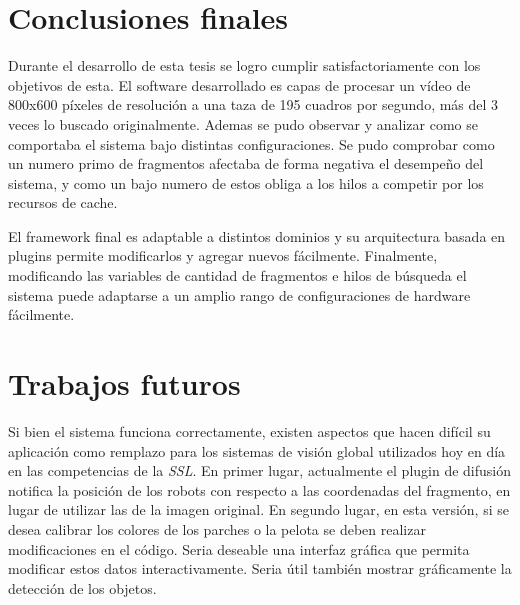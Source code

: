 
\section{Conclusiones finales}

Durante el desarrollo de esta tesis se logro cumplir satisfactoriamente con los
objetivos de esta. El software desarrollado es capas de procesar un vídeo de
800x600 píxeles de resolución a una taza de 195 cuadros por segundo, más del 3
veces lo buscado originalmente. Ademas se pudo observar y analizar como se
comportaba el sistema bajo distintas configuraciones. Se pudo comprobar como un
numero primo de fragmentos afectaba de forma negativa el desempeño del sistema,
y como un bajo numero de estos obliga a los hilos a competir por los recursos de
cache.

El framework final es adaptable a distintos dominios y su arquitectura basada en
plugins permite modificarlos y agregar nuevos fácilmente. Finalmente,
modificando las variables de cantidad de fragmentos e hilos de búsqueda el
sistema puede adaptarse a un amplio rango de configuraciones de hardware
fácilmente.

\section{Trabajos futuros}

Si bien el sistema funciona correctamente, existen aspectos que hacen difícil su
aplicación como remplazo para los sistemas de visión global utilizados hoy en
día en las competencias de la \emph{SSL}. En primer lugar, actualmente el plugin
de difusión notifica la posición de los robots con respecto a las coordenadas
del fragmento, en lugar de utilizar las de la imagen original. En segundo lugar,
en esta versión, si se desea calibrar los colores de los parches o la pelota se
deben realizar modificaciones en el código. Seria deseable una interfaz gráfica
que permita modificar estos datos interactivamente. Seria útil también mostrar
gráficamente la detección de los objetos.

